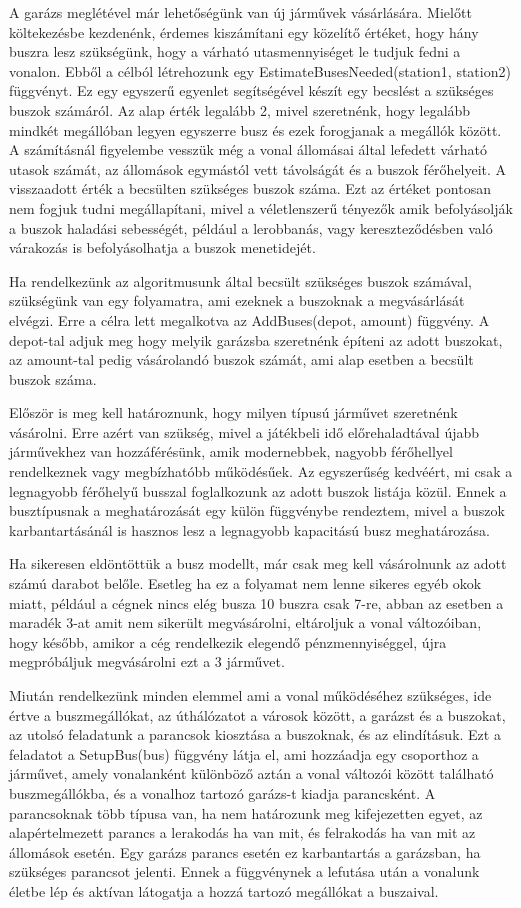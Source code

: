A garázs meglétével már lehetőségünk van új járművek vásárlására. Mielőtt költekezésbe kezdenénk, érdemes kiszámítani egy közelítő értéket, hogy hány buszra lesz szükségünk, hogy a várható utasmennyiséget le tudjuk fedni a vonalon. Ebből a célból létrehozunk egy EstimateBusesNeeded(station1, station2) függvényt. Ez egy egyszerű egyenlet segítségével készít egy becslést a szükséges buszok számáról. Az alap érték legalább 2, mivel szeretnénk, hogy legalább mindkét megállóban legyen egyszerre busz és ezek forogjanak a megállók között. A számításnál figyelembe vesszük még a vonal állomásai által lefedett várható utasok számát, az állomások egymástól vett távolságát és a buszok férőhelyeit. A visszaadott érték a becsülten szükséges buszok száma. Ezt az értéket pontosan nem fogjuk tudni megállapítani, mivel a véletlenszerű tényezők amik befolyásolják a buszok haladási sebességét, például a lerobbanás, vagy kereszteződésben való várakozás is befolyásolhatja a buszok menetidejét.

Ha rendelkezünk az algoritmusunk által becsült szükséges buszok számával, szükségünk van egy folyamatra, ami ezeknek a buszoknak a megvásárlását elvégzi. Erre a célra lett megalkotva az AddBuses(depot, amount) függvény. A depot-tal adjuk meg hogy melyik garázsba szeretnénk építeni az adott buszokat, az amount-tal pedig vásárolandó buszok számát, ami alap esetben a becsült buszok száma.

Először is meg kell határoznunk, hogy milyen típusú járművet szeretnénk vásárolni. Erre azért van szükség, mivel a játékbeli idő előrehaladtával újabb járművekhez van hozzáférésünk, amik modernebbek, nagyobb férőhellyel rendelkeznek vagy megbízhatóbb működésűek. Az egyszerűség kedvéért, mi csak a legnagyobb férőhelyű busszal foglalkozunk az adott buszok listája közül. Ennek a busztípusnak a meghatározását egy külön függvénybe rendeztem, mivel a buszok karbantartásánál is hasznos lesz a legnagyobb kapacitású busz meghatározása.

Ha sikeresen eldöntöttük a busz modellt, már csak meg kell vásárolnunk az adott számú darabot belőle. Esetleg ha ez a folyamat nem lenne sikeres egyéb okok miatt, például a cégnek nincs elég busza 10 buszra csak 7-re, abban az esetben a maradék 3-at amit nem sikerült megvásárolni, eltároljuk a vonal változóiban, hogy később, amikor a cég rendelkezik elegendő pénzmennyiséggel, újra megpróbáljuk megvásárolni ezt a 3 járművet.

Miután rendelkezünk minden elemmel ami a vonal működéséhez szükséges, ide értve a buszmegállókat, az úthálózatot a városok között, a garázst és a buszokat, az utolsó feladatunk a parancsok kiosztása a buszoknak, és az elindításuk. Ezt a feladatot a SetupBus(bus) függvény látja el, ami hozzáadja egy csoporthoz a járművet, amely vonalanként különböző aztán a vonal változói között található buszmegállókba, és a vonalhoz tartozó garázs-t kiadja parancsként. A parancsoknak több típusa van, ha nem határozunk meg kifejezetten egyet, az alapértelmezett parancs a lerakodás ha van mit, és felrakodás ha van mit az állomások esetén. Egy garázs parancs esetén ez karbantartás a garázsban, ha szükséges parancsot jelenti. Ennek a függvénynek a lefutása után a vonalunk életbe lép és aktívan látogatja a hozzá tartozó megállókat a buszaival.

